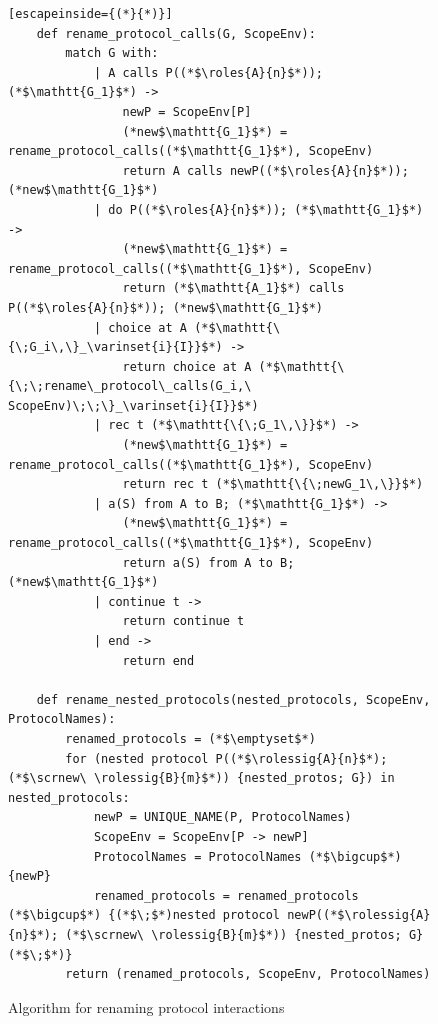 \documentclass[12pt,twoside]{report}
\begin{document}
\begin{figure}[h!]
    \centering
    \lstset{language=Pseudocode}
    \begin{lstlisting}[escapeinside={(*}{*)}]
    def rename_protocol_calls(G, ScopeEnv):
        match G with:
            | A calls P((*$\roles{A}{n}$*)); (*$\mathtt{G_1}$*) ->
                newP = ScopeEnv[P]
                (*new$\mathtt{G_1}$*) = rename_protocol_calls((*$\mathtt{G_1}$*), ScopeEnv)
                return A calls newP((*$\roles{A}{n}$*)); (*new$\mathtt{G_1}$*)
            | do P((*$\roles{A}{n}$*)); (*$\mathtt{G_1}$*) -> 
                (*new$\mathtt{G_1}$*) = rename_protocol_calls((*$\mathtt{G_1}$*), ScopeEnv)
                return (*$\mathtt{A_1}$*) calls P((*$\roles{A}{n}$*)); (*new$\mathtt{G_1}$*)
            | choice at A (*$\mathtt{\{\;G_i\,\}_\varinset{i}{I}}$*) ->
                return choice at A (*$\mathtt{\{\;\;rename\_protocol\_calls(G_i,\ ScopeEnv)\;\;\}_\varinset{i}{I}}$*)
            | rec t (*$\mathtt{\{\;G_1\,\}}$*) -> 
                (*new$\mathtt{G_1}$*) = rename_protocol_calls((*$\mathtt{G_1}$*), ScopeEnv)
                return rec t (*$\mathtt{\{\;newG_1\,\}}$*)
            | a(S) from A to B; (*$\mathtt{G_1}$*) ->
                (*new$\mathtt{G_1}$*) = rename_protocol_calls((*$\mathtt{G_1}$*), ScopeEnv)
                return a(S) from A to B; (*new$\mathtt{G_1}$*)
            | continue t ->
                return continue t
            | end ->
                return end
        
    def rename_nested_protocols(nested_protocols, ScopeEnv, ProtocolNames):
        renamed_protocols = (*$\emptyset$*)
        for (nested protocol P((*$\rolessig{A}{n}$*); (*$\scrnew\ \rolessig{B}{m}$*)) {nested_protos; G}) in nested_protocols:
            newP = UNIQUE_NAME(P, ProtocolNames)
            ScopeEnv = ScopeEnv[P -> newP]
            ProtocolNames = ProtocolNames (*$\bigcup$*) {newP}
            renamed_protocols = renamed_protocols (*$\bigcup$*) {(*$\;$*)nested protocol newP((*$\rolessig{A}{n}$*); (*$\scrnew\ \rolessig{B}{m}$*)) {nested_protos; G}(*$\;$*)}
        return (renamed_protocols, ScopeEnv, ProtocolNames)
    \end{lstlisting}
    \caption{Algorithm for renaming protocol interactions}
    \label{renaming-interactions}
\end{figure}
\clearpage
\end{document}
